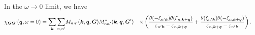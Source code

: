 \documentclass[hyperref, a4paper, 12pt]{report}
\def\\{}%
\begin{document}
In the $\omega \to 0$ limit, 
we have 
\begin{equation}
    \begin{aligned}
        \chi_{\vb*{G} \vb*{G}'}(\vb*{q}, \omega = 0) = \sum_{\vb*{k}} \sum_{n, n'} 
        &M_{n n'} (\vb*{k}, \vb*{q}, \vb*{G}) M^*_{nn'} (\vb*{k}, \vb*{q}, \vb*{G}') \\
        &\times \left(
            \frac{
                \theta(- \xi_{n' \vb*{k}}) \theta(\xi_{n, \vb*{k} + \vb*{q}})
            }{
                \varepsilon_{n' \vb*{k}} - \varepsilon_{n, \vb*{k} + \vb*{q}} 
            }
            + \frac{
                \theta(\xi_{n' \vb*{k}}) \theta(- \xi_{n, \vb*{k} + \vb*{q}})
            }{
                \varepsilon_{n, \vb*{k} + \vb*{q}} - \varepsilon_{n' \vb*{k}}
            }
        \right).
    \end{aligned}
    \label{eq:static-epsilon}
\end{equation}
\end{document}
